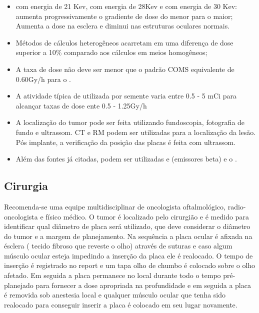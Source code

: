\documentclass[11pt,a4paper]{article}
\begin{document}
\begin{itemize}
        \item {} com energia de 21 Kev,  com energia de 28Kev e  com energia de 30 Kev: aumenta progressivamente o gradiente de dose do menor para o maior; Aumenta a dose na esclera e diminui nas estruturas oculares normais.
        \item Métodos de cálculos heterogêneos acarretam em uma diferença de dose superior a 10\% comparado aos cálculos em meios homogêneos;
        \item A taxa de dose não deve ser menor que o padrão COMS equivalente de 0.60Gy/h para o .
        \item A atividade típica de  utilizada por semente varia entre 0.5 - 5 mCi para alcançar taxas de dose ente 0.5 - 1.25Gy/h
        \item A localização do tumor pode ser feita utilizando fundoscopia, fotografia  de fundo e ultrassom. CT e RM podem ser utilizadas para a localização da lesão. Pós implante, a verificação da posição das placas é feita com ultrassom.
        \item Além das fontes já citadas, podem ser utilizadas  e  (emissores beta) e o .
    \end{itemize}


\subsection*{Cirurgia}

    Recomenda-se uma equipe multidisciplinar de oncologista oftalmológico, radio-oncologista e físico médico. O tumor é localizado pelo cirurgião e é medido para identificar qual diâmetro de placa será utilizado, que deve considerar o diâmetro do tumor e a margem de planejamento. Na sequência a placa ocular é afixada na ésclera ( tecido fibroso que reveste o olho) através de suturas e caso algum músculo ocular esteja impedindo a inserção da placa ele é realocado. O tempo de inserção é registrado no report e um tapa olho de chumbo é colocado sobre o olho afetado. Em seguida a placa permanece no local durante todo o tempo pré-planejado para fornecer a dose apropriada na profundidade e em seguida a placa é removida sob anestesia local e qualquer músculo ocular que tenha sido realocado para conseguir inserir a placa é colocado em seu lugar novamente.
\end{document}
